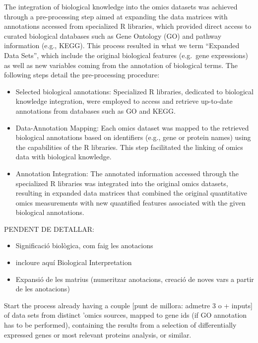\documentclass[a4paper, nobind]{templates/ociamthesis}
\begin{document}
The integration of biological knowledge into the omics datasets was achieved through a pre-processing step aimed at expanding the data matrices with annotations accessed from specialized R libraries, which provided direct access to curated biological databases such as Gene Ontology (GO) and pathway information (e.g., KEGG). This process resulted in what we term ``Expanded Data Sets'', which include the original biological features (e.g.~gene expressions) as well as new variables coming from the annotation of biological terms. The following steps detail the pre-processing procedure:

\begin{itemize}
\item
  Selected biological annotations: Specialized R libraries, dedicated to biological knowledge integration, were employed to access and retrieve up-to-date annotations from databases such as GO and KEGG.
\item
  Data-Annotation Mapping: Each omics dataset was mapped to the retrieved biological annotations based on identifiers (e.g., gene or protein names) using the capabilities of the R libraries. This step facilitated the linking of omics data with biological knowledge.
\item
  Annotation Integration: The annotated information accessed through the specialized R libraries was integrated into the original omics datasets, resulting in expanded data matrices that combined the original quantitative omics measurements with new quantified features associated with the given biological annotations.
\end{itemize}

PENDENT DE DETALLAR:

\begin{itemize}
\item
  Significació biològica, com faig les anotacions
\item
  incloure aquí Biological Interpretation
\item
  Expansió de les matrius (numeritzar anotacions, creació de noves vars a partir de les anotacions)
\end{itemize}

Start the process already having a couple {[}punt de millora: admetre 3 o + inputs{]} of data sets from distinct 'omics sources, mapped to gene ids (if GO annotation has to be performed), containing the results from a selection of differentially expressed genes or most relevant proteins analysis, or similar.
\end{document}
